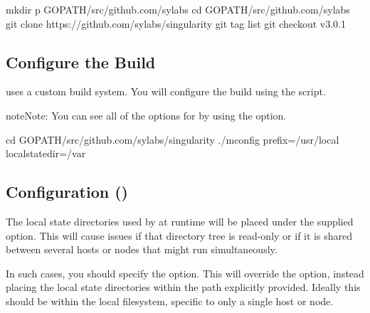 \documentclass[letterpaper,10pt,english]{sphinxmanual}
\begin{document}
%
\begin{sphinxVerbatim}[commandchars=\\\{\}]
\PYGZdl{} mkdir \PYGZhy{}p \PYGZdl{}GOPATH/src/github.com/sylabs
\PYGZdl{} cd \PYGZdl{}GOPATH/src/github.com/sylabs
\PYGZdl{} git clone https://github.com/sylabs/singularity
\PYGZdl{} git tag \PYGZhy{}\PYGZhy{}list
\PYGZdl{} git checkout v3.0.1
\end{sphinxVerbatim}


\subsection{Configure the Build}
\label{\detokenize{admin_quickstart:configure-the-build}}
 uses a custom build system. You will configure the build using
the  script.

\begin{sphinxadmonition}{note}{Note:}
You can see all of the options for  by using the 
option.
\end{sphinxadmonition}

%
\begin{sphinxVerbatim}[commandchars=\\\{\}]
\PYGZdl{} cd \PYGZdl{}GOPATH/src/github.com/sylabs/singularity
\PYGZdl{} ./mconfig \PYGZhy{}\PYGZhy{}prefix=/usr/local \PYGZhy{}\PYGZhy{}localstatedir=/var
\end{sphinxVerbatim}


\subsection{Configuration ()}
\label{\detokenize{admin_quickstart:configuration-localstatedir}}
The local state directories used by  at runtime will be placed
under the supplied  option. This will cause issues if that directory
tree is read-only or if it is shared between several hosts or nodes that might
run  simultaneously.

In such cases, you should specify the  option. This will
override the  option, instead placing the local state directories
within the path explicitly provided. Ideally this should be within the local
filesystem, specific to only a single host or node.
\end{document}
